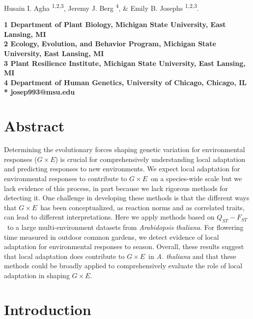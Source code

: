 \documentclass[11pt,letterpaper]{article}
\newcommand{\gxe}{$G \times E$}
\newcommand{\qf}{$Q_{ST}-F_{ST}$}
\begin{document}
\begin{flushleft}
\textbf\newline
{\Large
\textbf{}
}
\newline


Husain I. Agha \textsuperscript{1,2,3},
Jeremy J. Berg \textsuperscript{4}, \&
Emily B. Josephs \textsuperscript{1,2,3}.


\bigskip
\bf{1} Department of Plant Biology, Michigan State University, East Lansing, MI
\\
\bf{2} Ecology, Evolution, and Behavior Program, Michigan State University, East Lansing, MI
\\
\bf{3} Plant Resilience Institute, Michigan State University, East Lansing, MI
\\
\bf{4} Department of Human Genetics, University of Chicago, Chicago, IL
\\
\bigskip
* josep993@msu.edu
\end{flushleft}


\linenumbers

\section*{Abstract}
Determining the evolutionary forces shaping genetic variation for environmental responses (\gxe) is crucial for comprehensively understanding local adaptation and predicting responses to new environments. 
We expect local adaptation for environmental responses to contribute to \gxe\ on a species-wide scale but we lack evidence of this process, in part because we lack rigorous methods for detecting it.
One challenge in developing these methods is that the different ways that \gxe\ has been conceptualized, as reaction norms and as correlated traits, can lead to different interpretations.
Here we apply methods based on \qf\ to a large multi-environment datasets from \textit{Arabidopsis thaliana}.
For flowering time measured in outdoor common gardens, we detect evidence of local adaptation for environmental responses to season.
Overall, these results suggest that local adaptation does contribute to \gxe\ in \textit{A. thaliana} and that these methods could be broadly applied to comprehensively evaluate the role of local adaptation in shaping \gxe.

\section*{Introduction}
\end{document}

